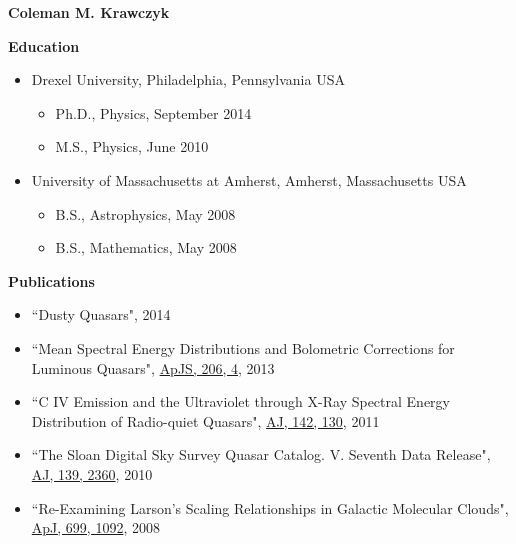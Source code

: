 \iffinal{}{\newpage}

\begin{vita}

{\Large\bf Coleman M. Krawczyk}

\singlespacing
{\large\bf Education}
\begin{itemize} \itemsep -2pt
\item Drexel University, Philadelphia, Pennsylvania USA
	\vspace{-2pt}
	\begin{itemize} \itemsep -2pt
		\item Ph.D., Physics, September 2014
		\item M.S., Physics, June 2010
	\end{itemize}
	\vspace{-2pt}
\item University of Massachusetts at Amherst, Amherst, Massachusetts USA
	\vspace{-2pt}
	\begin{itemize} \itemsep -2pt
		\item B.S., Astrophysics, May 2008
		\item B.S., Mathematics, May 2008
	\end{itemize}
\end{itemize}

{\large\bf Publications}
\begin{itemize} \itemsep -2pt
	\item ``Dusty Quasars", 2014
	\item ``Mean Spectral Energy Distributions and Bolometric Corrections for Luminous Quasars", \href{http://dx.doi.org/10.1088/0067-0049/206/1/4}{ApJS, 206, 4}, 2013
	\item  ``C IV Emission and the Ultraviolet through X-Ray Spectral Energy Distribution of Radio-quiet Quasars", \href{http://dx.doi.org/10.1088/0004-6256/142/4/130}{AJ, 142, 130}, 2011
	\item  ``The Sloan Digital Sky Survey Quasar Catalog. V. Seventh Data Release", \href{http://dx.doi.org/10.1088/0004-6256/139/6/2360}{AJ, 139, 2360}, 2010
	\item ``Re-Examining Larson's Scaling Relationships in Galactic Molecular Clouds", \href{http://dx.doi.org/10.1088/0004-637X/699/2/1092}{ApJ, 699, 1092}, 2008
\end{itemize}



\end{vita}
